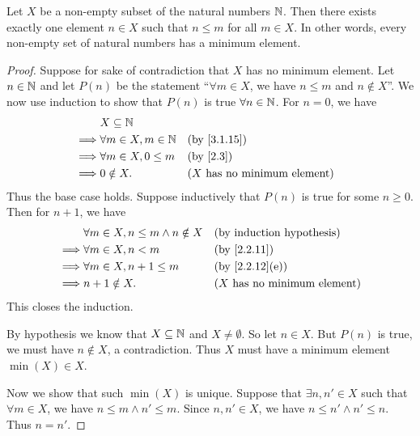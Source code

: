 \begin{prop}\label{8.1.4}
  Let \(X\) be a non-empty subset of the natural numbers \(\mathbb{N}\).
  Then there exists exactly one element \(n \in X\) such that \(n \leq m\) for all \(m \in X\).
  In other words, every non-empty set of natural numbers has a minimum element.
\end{prop}

\begin{proof}
  Suppose for sake of contradiction that \(X\) has no minimum element.
  Let \(n \in \mathbb{N}\) and let \(P(n)\) be the statement ``\(\forall m \in X\), we have \(n \leq m\) and \(n \notin X\)''.
  We now use induction to show that \(P(n)\) is true \(\forall n \in \mathbb{N}\).
  For \(n = 0\), we have
  \begin{align*}
             & X \subseteq \N                                                       \\
    \implies & \forall m \in X, m \in \N &  & \by{3.1.15}                           \\
    \implies & \forall m \in X, 0 \leq m &  & \text{(by \cref{2.3})}                \\
    \implies & 0 \notin X.               &  & \text{(\(X\) has no minimum element)}
  \end{align*}
  Thus the base case holds.
  Suppose inductively that \(P(n)\) is true for some \(n \geq 0\).
  Then for \(n + 1\), we have
  \begin{align*}
             & \forall m \in X, n \leq m \land n \notin X &  & \byIH                                 \\
    \implies & \forall m \in X, n < m                     &  & \by{2.2.11}                           \\
    \implies & \forall m \in X, n + 1 \leq m              &  & \text{(by \cref{2.2.12}(e))}          \\
    \implies & n + 1 \notin X.                            &  & \text{(\(X\) has no minimum element)}
  \end{align*}
  This closes the induction.

  By hypothesis we know that \(X \subseteq \mathbb{N}\) and \(X \neq \emptyset\).
  So let \(n \in X\).
  But \(P(n)\) is true, we must have \(n \notin X\), a contradiction.
  Thus \(X\) must have a minimum element \(\min(X) \in X\).

  Now we show that such \(\min(X)\) is unique.
  Suppose that \(\exists n, n' \in X\) such that \(\forall m \in X\), we have \(n \leq m \land n' \leq m\).
  Since \(n, n' \in X\), we have \(n \leq n' \land n' \leq n\).
  Thus \(n = n'\).
\end{proof}

